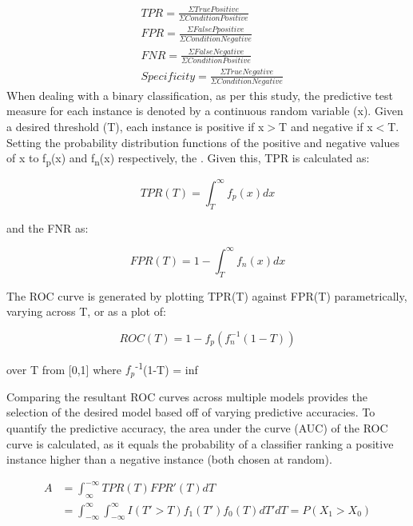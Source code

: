\begin{equation}
\begin{aligned}
& TPR = \frac{\Sigma True Positive}{\Sigma Condition Positive} \\
& FPR = \frac{\Sigma False Ppositive}{\Sigma Condition Negative} \\
& FNR = \frac{\Sigma False Negative}{\Sigma Condition Positive} \\ 
& Specificity = \frac{\Sigma True Negative}{\Sigma Condition Negative} 
\end{aligned}
\end{equation}
When dealing with a binary classification, as per this study, the predictive test measure for  each instance is denoted by a continuous random variable (x). Given a desired threshold (T), each instance is positive if x$>$T and negative if x$<$T. Setting the probability distribution functions of the positive and negative values of x to f\textsubscript{p}(x) and f\textsubscript{n}(x) respectively, the . Given this, TPR is calculated as:

\begin{equation}
TPR(T) = \int_{T}^{\infty} f_p(x) dx
\end{equation}

and the FNR as:
 
\begin{equation}
FPR(T) = 1- \int_{T}^{\infty} f_n(x) dx
\end{equation}

The ROC curve is generated by plotting TPR(T) against FPR(T) parametrically, varying across T, or as a plot of:

\begin{equation}
ROC(T) = 1 - f_p(f_n ^{-1} (1-T))
\end{equation}

over T from [0,1] where $f_p$\textsuperscript{-1}(1-T) = inf

Comparing the resultant ROC curves across multiple models provides the selection of the desired model based off of varying predictive accuracies. To quantify the predictive accuracy, the area under the curve (AUC) of the ROC curve is calculated, as it equals the probability of a classifier ranking a positive instance higher than a negative instance (both chosen at random).

\begin{equation}
\begin{aligned}
A &= \int_{\infty}^{-\infty} TPR(T) FPR' (T) dT \\
  &= \int_{-\infty}^{\infty}\int_{-\infty}^{\infty} I(T' >T)f_1 (T' )f_0 (T) dT' dT = P(X_1 > X_0)
\end{aligned}
\end{equation}

